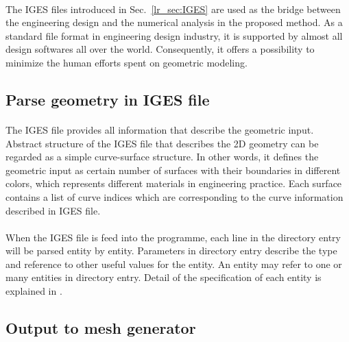 \paragraph{}
The IGES\citep{IGES1983} files introduced in Sec.~\ref{lr_sec:IGES} are used as the bridge between the engineering design and the numerical analysis in the proposed method.
As a standard file format in engineering design industry, it is supported by almost all design softwares all over the world.
Consequently, it offers a possibility to minimize the human efforts spent on geometric modeling.

\subsection{Parse geometry in IGES file}
\paragraph{}
The IGES file provides all information that describe the geometric input.
Abstract structure of the IGES file that describes the 2D geometry can be regarded as a simple curve-surface structure.
In other words, it defines the geometric input as certain number of surfaces with their boundaries in different colors, which represents different materials in engineering practice.
Each surface contains a list of curve indices which are corresponding to the curve information described in IGES file.

\paragraph{}
When the IGES file is feed into the programme, each line in the directory entry will be parsed entity by entity.
Parameters in directory entry describe the type and reference to other useful values for the entity.
An entity may refer to one or many entities in directory entry.
Detail of the specification of each entity is explained in \cite{Nasr2007}.

\subsection{Output to mesh generator}
\label{qdt_section:iges_output}
